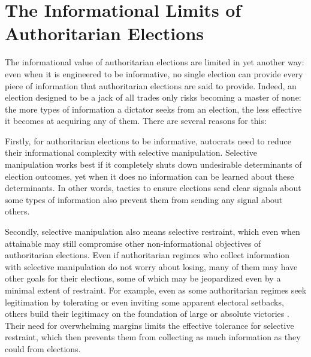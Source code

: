 \documentclass[12pt]{article}
\newcommand{\1}{\mathbbm{1}}
\begin{document}
\section*{The Informational Limits of Authoritarian Elections}
\label{sec:theory_limits}

The informational value of authoritarian elections are limited in yet another way: even when it is engineered to be informative, no single election can provide every piece of information that authoritarian elections are said to provide. Indeed, an election designed to be a jack of all trades only risks becoming a master of none: the more types of information a dictator seeks from an election, the less effective it becomes at acquiring any of them. There are several reasons for this:

Firstly, for authoritarian elections to be informative, autocrats need to reduce their informational complexity with selective manipulation. Selective manipulation works best if it completely shuts down undesirable determinants of election outcomes, yet when it does no information can be learned about these determinants. In other words, tactics to ensure elections send clear signals about some types of information also prevent them from sending any signal about others.

Secondly, selective manipulation also means selective restraint, which even when attainable may still compromise other non-informational objectives of authoritarian elections. Even if authoritarian regimes who collect information with selective manipulation do not worry about losing, many of them may have other goals for their elections, some of which may be jeopardized even by a minimal extent of restraint. For example, even as some authoritarian regimes seek legitimation by tolerating or even inviting some apparent electoral setbacks, others build their legitimacy on the foundation of large or absolute victories \parencite{Morgenbesser2016, Simpser2013}. Their need for overwhelming margins limits the effective tolerance for selective restraint, which then prevents them from collecting as much information as they could from elections.
\end{document}
